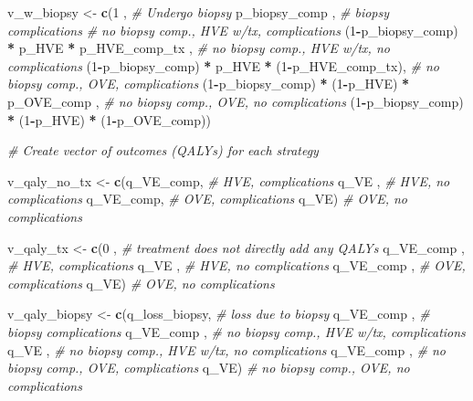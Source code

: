 \documentclass[
]{article}
\newenvironment{Shaded}{\begin{snugshade}}{\end{snugshade}}
\newcommand{\CommentTok}[1]{\textcolor[rgb]{0.56,0.35,0.01}{\textit{#1}}}
\newcommand{\DecValTok}[1]{\textcolor[rgb]{0.00,0.00,0.81}{#1}}
\newcommand{\KeywordTok}[1]{\textcolor[rgb]{0.13,0.29,0.53}{\textbf{#1}}}
\newcommand{\NormalTok}[1]{#1}
\newcommand{\OperatorTok}[1]{\textcolor[rgb]{0.81,0.36,0.00}{\textbf{#1}}}
\newcommand{\StringTok}[1]{\textcolor[rgb]{0.31,0.60,0.02}{#1}}
\begin{document}
\begin{Shaded}
\begin{Highlighting}[]
\NormalTok{  v_w_biopsy <-}\StringTok{ }\KeywordTok{c}\NormalTok{(}\DecValTok{1}\NormalTok{                                     , }\CommentTok{# Undergo biopsy}
\NormalTok{                  p_biopsy_comp                         , }\CommentTok{# biopsy complications}
                 \CommentTok{# no biopsy comp., HVE w/tx,  complications}
\NormalTok{                 (}\DecValTok{1}\OperatorTok{-}\NormalTok{p_biopsy_comp) }\OperatorTok{*}\StringTok{    }\NormalTok{p_HVE  }\OperatorTok{*}\StringTok{    }\NormalTok{p_HVE_comp_tx ,  }
                 \CommentTok{# no biopsy comp., HVE w/tx, no complications}
\NormalTok{                 (}\DecValTok{1}\OperatorTok{-}\NormalTok{p_biopsy_comp) }\OperatorTok{*}\StringTok{    }\NormalTok{p_HVE  }\OperatorTok{*}\StringTok{ }\NormalTok{(}\DecValTok{1}\OperatorTok{-}\NormalTok{p_HVE_comp_tx),  }
                 \CommentTok{# no biopsy comp., OVE, complications}
\NormalTok{                 (}\DecValTok{1}\OperatorTok{-}\NormalTok{p_biopsy_comp) }\OperatorTok{*}\StringTok{ }\NormalTok{(}\DecValTok{1}\OperatorTok{-}\NormalTok{p_HVE) }\OperatorTok{*}\StringTok{    }\NormalTok{p_OVE_comp    ,  }
                 \CommentTok{# no biopsy comp., OVE, no complications}
\NormalTok{                 (}\DecValTok{1}\OperatorTok{-}\NormalTok{p_biopsy_comp) }\OperatorTok{*}\StringTok{ }\NormalTok{(}\DecValTok{1}\OperatorTok{-}\NormalTok{p_HVE) }\OperatorTok{*}\StringTok{ }\NormalTok{(}\DecValTok{1}\OperatorTok{-}\NormalTok{p_OVE_comp))      }
  
  \CommentTok{# Create vector of outcomes (QALYs) for each strategy }
  
\NormalTok{  v_qaly_no_tx  <-}\StringTok{ }\KeywordTok{c}\NormalTok{(q_VE_comp, }\CommentTok{# HVE, complications}
\NormalTok{                     q_VE     , }\CommentTok{# HVE, no complications}
\NormalTok{                     q_VE_comp, }\CommentTok{# OVE, complications}
\NormalTok{                     q_VE)      }\CommentTok{# OVE, no complications}
  
\NormalTok{  v_qaly_tx     <-}\StringTok{ }\KeywordTok{c}\NormalTok{(}\DecValTok{0}\NormalTok{         , }\CommentTok{# treatment does not directly add any QALYs }
\NormalTok{                     q_VE_comp , }\CommentTok{# HVE, complications}
\NormalTok{                     q_VE      , }\CommentTok{# HVE, no complications}
\NormalTok{                     q_VE_comp , }\CommentTok{# OVE, complications}
\NormalTok{                     q_VE)       }\CommentTok{# OVE, no complications}
  
  
\NormalTok{  v_qaly_biopsy <-}\StringTok{ }\KeywordTok{c}\NormalTok{(q_loss_biopsy, }\CommentTok{# loss due to biopsy}
\NormalTok{                     q_VE_comp    , }\CommentTok{# biopsy complications}
\NormalTok{                     q_VE_comp    , }\CommentTok{# no biopsy comp., HVE w/tx, complications }
\NormalTok{                     q_VE         , }\CommentTok{# no biopsy comp., HVE w/tx, no complications}
\NormalTok{                     q_VE_comp    , }\CommentTok{# no biopsy comp., OVE, complications}
\NormalTok{                     q_VE)          }\CommentTok{# no biopsy comp., OVE, no complications}
  

\end{Highlighting}
\end{Shaded}
\end{document}
